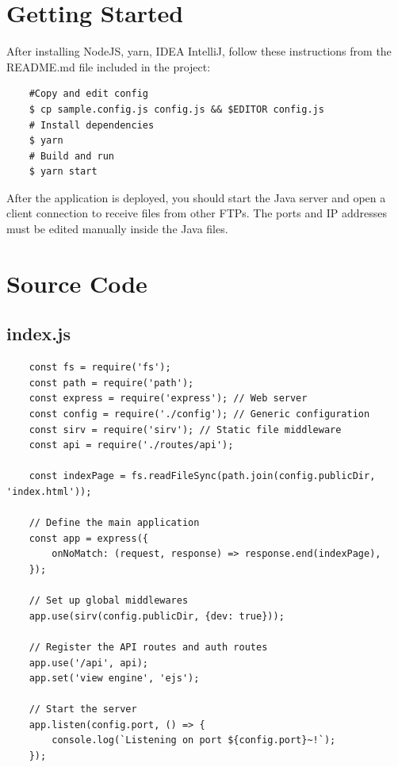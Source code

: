 \documentclass[12pt]{article}
\begin{document}
\section{Getting Started}
After installing NodeJS, yarn, IDEA IntelliJ, follow these instructions from the README.md file included in the project:
\begin{verbatim}
	#Copy and edit config
	$ cp sample.config.js config.js && $EDITOR config.js
	# Install dependencies
	$ yarn
	# Build and run
	$ yarn start
\end{verbatim}

After the application is deployed, you should start the Java server and open a client connection to receive files 
from other FTPs. The ports and IP addresses must be edited manually inside the Java files.

\section{Source Code}

\subsection{index.js}
\begin{verbatim}
	const fs = require('fs');
	const path = require('path');
	const express = require('express'); // Web server
	const config = require('./config'); // Generic configuration
	const sirv = require('sirv'); // Static file middleware
	const api = require('./routes/api');
	
	const indexPage = fs.readFileSync(path.join(config.publicDir, 'index.html'));
	
	// Define the main application
	const app = express({
		onNoMatch: (request, response) => response.end(indexPage),
	});
	
	// Set up global middlewares
	app.use(sirv(config.publicDir, {dev: true}));
	
	// Register the API routes and auth routes
	app.use('/api', api);
	app.set('view engine', 'ejs');
	
	// Start the server
	app.listen(config.port, () => {
		console.log(`Listening on port ${config.port}~!`);
	});
\end{verbatim}
\end{document}
